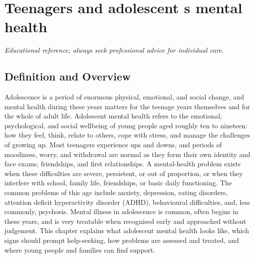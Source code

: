 \chapter{Teenagers and adolescent s mental health}

\medskip
\noindent\textit{Educational reference; always seek professional advice for individual care.}

\section*{Definition and Overview}
Adolescence is a period of enormous physical, emotional, and social change, and mental health during these years matters for the teenage years themselves and for the whole of adult life. Adolescent mental health refers to the emotional, psychological, and social wellbeing of young people aged roughly ten to nineteen: how they feel, think, relate to others, cope with stress, and manage the challenges of growing up. Most teenagers experience ups and downs, and periods of moodiness, worry, and withdrawal are normal as they form their own identity and face exams, friendships, and first relationships. A mental-health problem exists when these difficulties are severe, persistent, or out of proportion, or when they interfere with school, family life, friendships, or basic daily functioning. The common problems of this age include anxiety, depression, eating disorders, attention deficit hyperactivity disorder (ADHD), behavioural difficulties, and, less commonly, psychosis. Mental illness in adolescence is common, often begins in these years, and is very treatable when recognised early and approached without judgement. This chapter explains what adolescent mental health looks like, which signs should prompt help-seeking, how problems are assessed and treated, and where young people and families can find support.

